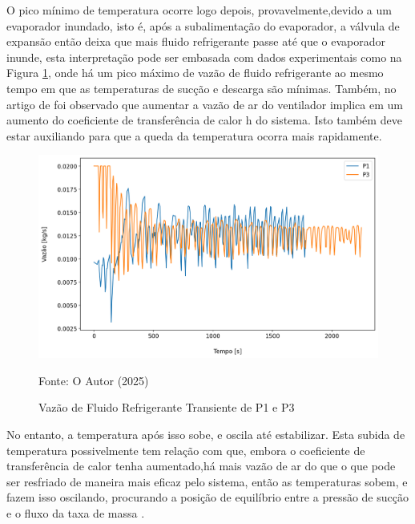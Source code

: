 O pico mínimo de temperatura ocorre logo depois, provavelmente,devido a um evaporador inundado, isto é, após a subalimentação do evaporador, a válvula de expansão então deixa que mais fluido refrigerante passe até que o evaporador inunde, esta interpretação pode ser embasada com dados experimentais como na Figura \ref{fig:VazãodeFluidoPerturbaçãoVentilador}, onde há um pico máximo de vazão de fluido refrigerante ao mesmo tempo em que as temperaturas de sucção e descarga são mínimas. Também, no artigo de \textcite{VaryingFanSpeedCavallaro} foi observado que aumentar a vazão de ar do ventilador implica em um aumento do coeficiente de transferência de calor h do sistema. Isto também deve estar auxiliando para que a queda da temperatura ocorra mais rapidamente.
\newpage
\begin{figure}[h]
    \centering
    \includegraphics[width=1\linewidth]{FigurasdoTexto/VazãodeFluidoPerturbaçãoVentilador.png}
    \caption{Vazão de Fluido Refrigerante Transiente de P1 e P3}
    \label{fig:VazãodeFluidoPerturbaçãoVentilador}
    {\footnotesize Fonte: O Autor (2025)}
\end{figure}

No entanto, a temperatura após isso sobe, e oscila até estabilizar. Esta subida de temperatura possivelmente tem relação com que, embora o coeficiente de transferência de calor tenha aumentado,há mais vazão de ar do que o que pode ser resfriado de maneira mais eficaz pelo sistema, então as temperaturas sobem, e fazem isso oscilando, procurando a posição de equilíbrio entre a pressão de sucção e o fluxo da taxa de massa \cite{StoekerRefrigeration}.  

